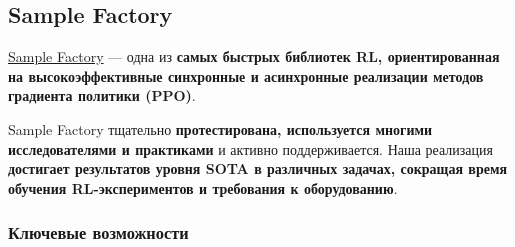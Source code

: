 \documentclass[11pt,a4paper]{article}
\begin{document}
\subsection{Sample Factory}\label{sample-factory}

\href{https://www.samplefactory.dev/}{Sample Factory} --- одна из \textbf{самых быстрых библиотек RL, ориентированная на высокоэффективные синхронные и асинхронные реализации методов градиента политики (PPO)}.

Sample Factory тщательно \textbf{протестирована, используется многими исследователями и практиками} и активно поддерживается. Наша реализация \textbf{достигает результатов уровня SOTA в различных задачах, сокращая время обучения RL-экспериментов и требования к оборудованию}.


\subsubsection{Ключевые возможности}\label{key-features}
\end{document}
